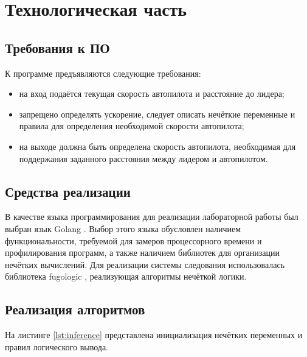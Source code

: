 \chapter{Технологическая часть}

\section{Требования к ПО}

К программе предъявляются следующие требования:
\begin{itemize}[label*=---]
	\item на вход подаётся текущая скорость автопилота и расстояние до лидера;
	\item запрещено определять ускорение, следует описать нечёткие переменные и правила для определения необходимой скорости автопилота;
	\item на выходе должна быть определена скорость автопилота, необходимая для поддержания заданного расстояния между лидером и автопилотом.
\end{itemize}

\section{Средства реализации}

В качестве языка программирования для реализации лабораторной работы был выбран язык Golang \cite{golang}. Выбор этого языка обусловлен наличием функциональности, требуемой для замеров процессорного времени и профилирования программ, а также наличием библиотек для организации нечётких вычислений. Для реализации системы следования использовалась библиотека fugologic \cite{lib}, реализующая алгоритмы нечёткой логики.

\section{Реализация алгоритмов}

На листинге \ref{lst:inference} представлена инициализация нечётких переменных и правил логического вывода.

